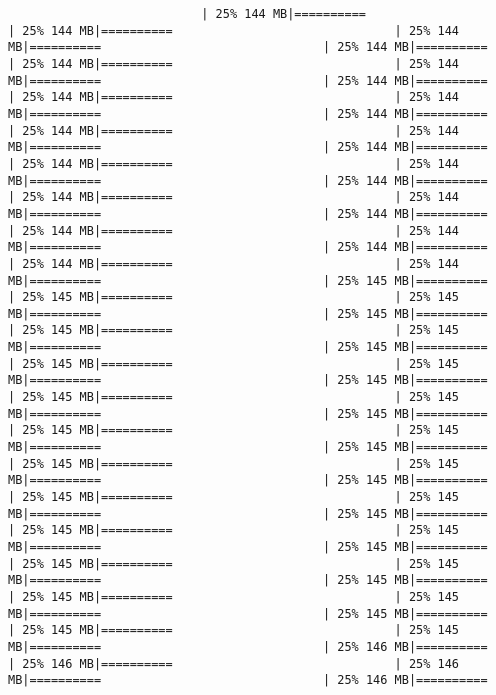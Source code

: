 \documentclass[
]{article}
\begin{document}
\begin{verbatim}
                           | 25% 144 MB|==========                               | 25% 144 MB|==========                               | 25% 144 MB|==========                               | 25% 144 MB|==========                               | 25% 144 MB|==========                               | 25% 144 MB|==========                               | 25% 144 MB|==========                               | 25% 144 MB|==========                               | 25% 144 MB|==========                               | 25% 144 MB|==========                               | 25% 144 MB|==========                               | 25% 144 MB|==========                               | 25% 144 MB|==========                               | 25% 144 MB|==========                               | 25% 144 MB|==========                               | 25% 144 MB|==========                               | 25% 144 MB|==========                               | 25% 144 MB|==========                               | 25% 144 MB|==========                               | 25% 144 MB|==========                               | 25% 144 MB|==========                               | 25% 144 MB|==========                               | 25% 144 MB|==========                               | 25% 144 MB|==========                               | 25% 145 MB|==========                               | 25% 145 MB|==========                               | 25% 145 MB|==========                               | 25% 145 MB|==========                               | 25% 145 MB|==========                               | 25% 145 MB|==========                               | 25% 145 MB|==========                               | 25% 145 MB|==========                               | 25% 145 MB|==========                               | 25% 145 MB|==========                               | 25% 145 MB|==========                               | 25% 145 MB|==========                               | 25% 145 MB|==========                               | 25% 145 MB|==========                               | 25% 145 MB|==========                               | 25% 145 MB|==========                               | 25% 145 MB|==========                               | 25% 145 MB|==========                               | 25% 145 MB|==========                               | 25% 145 MB|==========                               | 25% 145 MB|==========                               | 25% 145 MB|==========                               | 25% 145 MB|==========                               | 25% 145 MB|==========                               | 25% 145 MB|==========                               | 25% 145 MB|==========                               | 25% 145 MB|==========                               | 25% 145 MB|==========                               | 25% 145 MB|==========                               | 25% 145 MB|==========                               | 25% 145 MB|==========                               | 25% 145 MB|==========                               | 25% 145 MB|==========                               | 25% 146 MB|==========                               | 25% 146 MB|==========                               | 25% 146 MB|==========                               | 25% 146 MB|==========                             
\end{verbatim}
\end{document}
